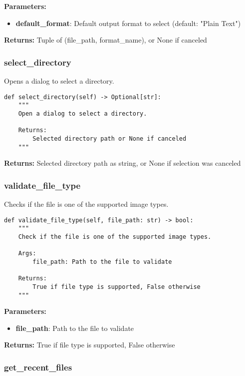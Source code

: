\textbf{Parameters:}
\begin{itemize}
    \item \textbf{default\_format}: Default output format to select (default: "Plain Text")
\end{itemize}

\textbf{Returns:} Tuple of (file\_path, format\_name), or None if canceled

\subsubsection{select\_directory}

Opens a dialog to select a directory.

\begin{verbatim}
def select_directory(self) -> Optional[str]:
    """
    Open a dialog to select a directory.
    
    Returns:
        Selected directory path or None if canceled
    """
\end{verbatim}

\textbf{Returns:} Selected directory path as string, or None if selection was canceled

\subsubsection{validate\_file\_type}

Checks if the file is one of the supported image types.

\begin{verbatim}
def validate_file_type(self, file_path: str) -> bool:
    """
    Check if the file is one of the supported image types.
    
    Args:
        file_path: Path to the file to validate
        
    Returns:
        True if file type is supported, False otherwise
    """
\end{verbatim}

\textbf{Parameters:}
\begin{itemize}
    \item \textbf{file\_path}: Path to the file to validate
\end{itemize}

\textbf{Returns:} True if file type is supported, False otherwise

\subsubsection{get\_recent\_files}

